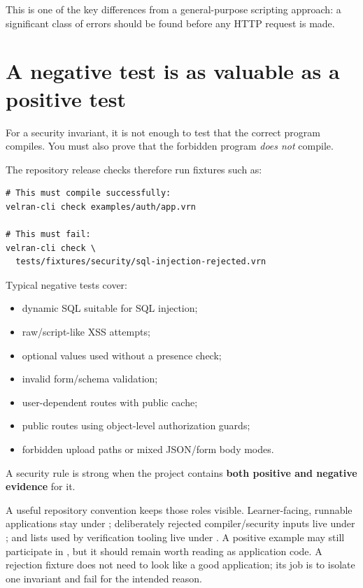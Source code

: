 This is one of the key differences from a general-purpose scripting approach: a significant class of errors should be found before any HTTP request is made.

\section{A negative test is as valuable as a positive test}

For a security invariant, it is not enough to test that the correct program compiles. You must also prove that the forbidden program \emph{does not} compile.

The repository release checks therefore run fixtures such as:

\begin{lstlisting}
# This must compile successfully:
velran-cli check examples/auth/app.vrn

# This must fail:
velran-cli check \
  tests/fixtures/security/sql-injection-rejected.vrn
\end{lstlisting}

Typical negative tests cover:

\begin{itemize}
  \item dynamic SQL suitable for SQL injection;
  \item raw/script-like XSS attempts;
  \item optional values used without a presence check;
  \item invalid form/schema validation;
  \item user-dependent routes with public cache;
  \item public routes using object-level authorization guards;
  \item forbidden upload paths or mixed JSON/form body modes.
\end{itemize}

A security rule is strong when the project contains \textbf{both positive and negative evidence} for it.

A useful repository convention keeps those roles visible. Learner-facing, runnable applications stay under ; deliberately rejected compiler/security inputs live under ; and lists used by verification tooling live under . A positive example may still participate in , but it should remain worth reading as application code. A rejection fixture does not need to look like a good application; its job is to isolate one invariant and fail for the intended reason.


